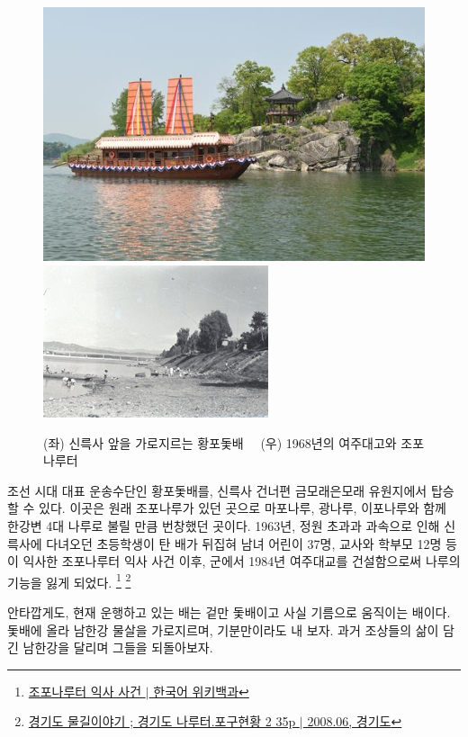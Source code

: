 \begin{figure}[ht]
    \centering
    \includegraphics[width=.45\textwidth]{img/황포돛배.jpg}
    \includegraphics[width=.45\textwidth]{img/조포나루.jpg}
    \caption{(좌) 신륵사 앞을 가로지르는 황포돛배\protect\footnotemark $\quad$ (우) 1968년의 여주대고와 조포나루터\protect\footnotemark }
    \label{fig:my_labe6}
\end{figure}


조선 시대 대표 운송수단인 황포돛배를, 신륵사 건너편 금모래은모래 유원지에서 탑승할 수 있다. 
이곳은 원래 조포나루가 있던 곳으로 마포나루, 광나루, 이포나루와 함께 한강변 4대 나루로 불릴 만큼 번창했던 곳이다.
1963년, 정원 초과과 과속으로 인해
신륵사에 다녀오던 초등학생이 탄 배가 뒤집혀 남녀 어린이 37명, 교사와 학부모 12명 등이 익사한 조포나루터 익사 사건 이후,
군에서 1984년 여주대교를 건설함으로써 나루의 기능을 잃게 되었다.
\footnote{\href{https://ko.wikipedia.org/wiki/조포나루터_익사_사건}{조포나루터 익사 사건 $|$ 한국어 위키백과}}
\footnote{\href{https://memory.library.kr/files/original/fdb94afbd1306c25cc6bd7f1c80e6f0f.pdf}{경기도 물길이야기 ; 경기도 나루터.포구현황 2 35p $|$ 2008.06, 경기도}}

안타깝게도, 현재 운행하고 있는 배는 겉만 돛배이고 사실 기름으로 움직이는 배이다.
돛배에 올라 남한강 물살을 가로지르며, 기분만이라도 내 보자.
과거 조상들의 삶이 담긴 남한강을 달리며 그들을 되돌아보자.

